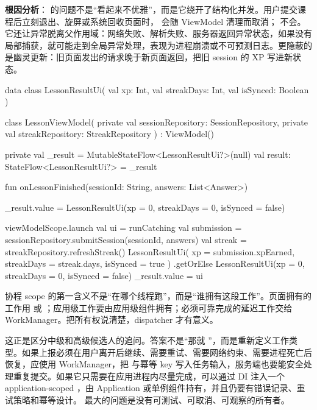\textbf{根因分析}： 的问题不是“看起来不优雅”，而是它绕开了结构化并发。用户提交课程后立刻退出、旋屏或系统回收页面时， 会随 ViewModel 清理而取消； 不会。它还让异常脱离父作用域：网络失败、解析失败、服务器返回异常状态，如果没有局部捕获，就可能走到全局异常处理，表现为进程崩溃或不可预测日志。更隐蔽的是幽灵更新：旧页面发出的请求晚于新页面返回，把旧 session 的 XP 写进新状态。 \srcinferred

\begin{ktfix}
data class LessonResultUi(
    val xp: Int,
    val streakDays: Int,
    val isSynced: Boolean
)

class LessonViewModel(
    private val sessionRepository: SessionRepository,
    private val streakRepository: StreakRepository
) : ViewModel() {

    private val _result = MutableStateFlow<LessonResultUi?>(null)
    val result: StateFlow<LessonResultUi?> = _result

    fun onLessonFinished(sessionId: String, answers: List<Answer>) {
        _result.value = LessonResultUi(xp = 0, streakDays = 0, isSynced = false)

        viewModelScope.launch {
            val ui = runCatching {
                val submission = sessionRepository.submitSession(sessionId, answers)
                val streak = streakRepository.refreshStreak()
                LessonResultUi(
                    xp = submission.xpEarned,
                    streakDays = streak.days,
                    isSynced = true
                )
            }.getOrElse {
                LessonResultUi(xp = 0, streakDays = 0, isSynced = false)
            }
            _result.value = ui
        }
    }
}
\end{ktfix}

\begin{idea}
协程 scope 的第一含义不是“在哪个线程跑”，而是“谁拥有这段工作”。页面拥有的工作用  或 ；应用级工作要由应用级组件拥有；必须可靠完成的延迟工作交给 WorkManager。把所有权说清楚，dispatcher 才有意义。
\end{idea}

\begin{followup}
这正是区分中级和高级候选人的追问。答案不是“那就 ”，而是重新定义工作类型。如果上报必须在用户离开后继续、需要重试、需要网络约束、需要进程死亡后恢复，应使用 WorkManager，把  与幂等 key 写入任务输入，服务端也要能安全处理重复提交。如果它只需要在应用进程内尽量完成，可以通过 DI 注入一个 application-scoped ，由 Application 或单例组件持有，并且仍要有错误记录、重试策略和幂等设计。 最大的问题是没有可测试、可取消、可观察的所有者。
\end{followup}

